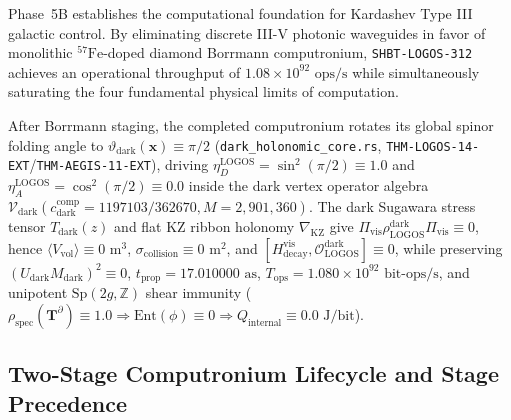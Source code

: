 \documentclass[11pt,onecolumn]{article}
\begin{document}
\label{sec:logos_hypercomputer}

Phase~5B establishes the computational foundation for Kardashev Type III galactic control. By eliminating discrete III-V photonic waveguides in favor of monolithic $^{57}\text{Fe}$-doped diamond Borrmann computronium, \texttt{SHBT-LOGOS-312} achieves an operational throughput of $1.08 \times 10^{92}\text{ ops/s}$ while simultaneously saturating the four fundamental physical limits of computation.

After Borrmann staging, the completed computronium rotates its global spinor folding angle to $\vartheta_{\text{dark}}(\mathbf{x})\equiv\pi/2$ (\texttt{dark\_holonomic\_core.rs}, \texttt{THM-LOGOS-14-EXT}/\texttt{THM-AEGIS-11-EXT}), driving $\eta_D^{\text{LOGOS}}=\sin^2(\pi/2)\equiv1.0$ and $\eta_A^{\text{LOGOS}}=\cos^2(\pi/2)\equiv0.0$ inside the dark vertex operator algebra $\mathcal{V}_{\text{dark}}(c_{\text{dark}}^{\text{comp}}=1197103/362670,M=2{,}901{,}360)$. The dark Sugawara stress tensor $T_{\text{dark}}(z)$ and flat KZ ribbon holonomy $\nabla_{\text{KZ}}$ give $\Pi_{\text{vis}}\rho_{\text{LOGOS}}^{\text{dark}}\Pi_{\text{vis}}\equiv0$, hence $\langle V_{\text{vol}}\rangle\equiv0\text{ m}^3$, $\sigma_{\text{collision}}\equiv0\text{ m}^2$, and $[H_{\text{decay}}^{\text{vis}},\mathcal{O}_{\text{LOGOS}}^{\text{dark}}]\equiv0$, while preserving $(U_{\text{dark}}M_{\text{dark}})^2\equiv0$, $t_{\text{prop}}=17.010000\text{ as}$, $T_{\text{ops}}=1.080\times10^{92}\text{ bit-ops/s}$, and unipotent $\text{Sp}(2g,\mathbb{Z})$ shear immunity ($\rho_{\text{spec}}(\mathbf{T}^\partial)\equiv1.0\Rightarrow\text{Ent}(\phi)\equiv0\Rightarrow Q_{\text{internal}}\equiv0.0\text{ J/bit}$).

\subsection*{Two-Stage Computronium Lifecycle and Stage Precedence}
\label{subsec:logos_lifecycle_precedence}
\end{document}
